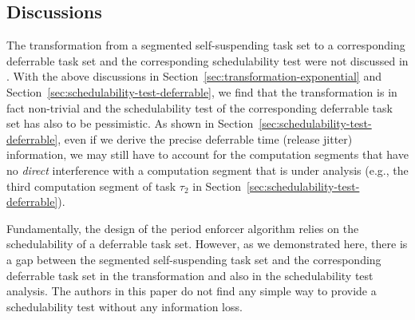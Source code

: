 \subsection{Discussions}
\label{sec:discussions-deferrable}

The transformation from a segmented self-suspending task set to a corresponding deferrable task set and the corresponding schedulability test were not discussed in \cite{Raj:suspension1991}. With the above discussions in Section~\ref{sec:transformation-exponential} and Section~\ref{sec:schedulability-test-deferrable}, we find that the transformation is in fact non-trivial and the schedulability test of the corresponding deferrable task set has also to be pessimistic. As shown in Section~\ref{sec:schedulability-test-deferrable}, even if we derive the precise deferrable time (release jitter) information, we may still have to account for the computation segments that have no \emph{direct} interference with a computation segment that is under analysis (e.g., the third computation segment of task $\tau_2$ in Section~\ref{sec:schedulability-test-deferrable}).

Fundamentally, the design of the period enforcer algorithm relies on the schedulability of a deferrable task set. However, as we demonstrated here, there is a gap between the segmented self-suspending task set and the corresponding deferrable task set in the transformation and also in the schedulability test analysis. The authors in this paper do not find any simple way to provide a schedulability test without any information loss.

